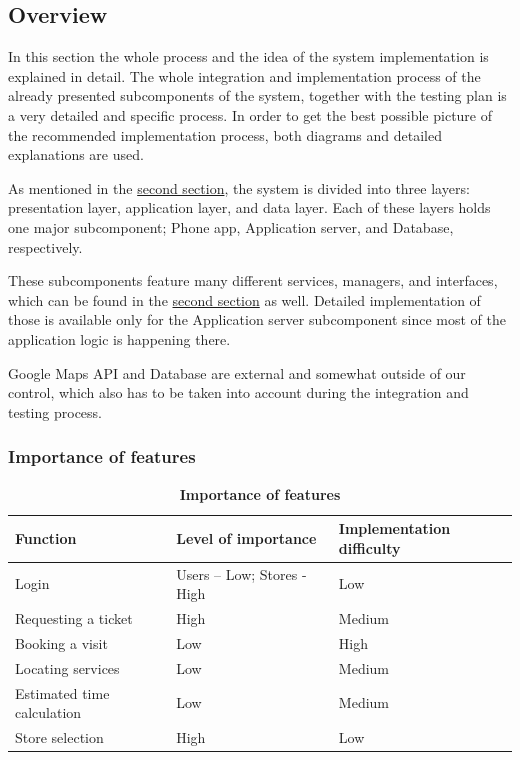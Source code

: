 \subsection{Overview}

\hspace{\parindent}In this section the whole process and the idea of the system implementation is explained in detail. The whole integration and implementation process of the already presented subcomponents of the system,  together with the testing plan is a very detailed and specific process. In order to get the best possible picture of the recommended implementation process, both diagrams and detailed explanations are used. \newline

As mentioned in the \hyperlink{section.2}{second section}, the system is divided into three layers: presentation layer, application layer, and data layer. Each of these layers holds one major subcomponent; Phone app, Application server, and Database, respectively.  \newline

 

These subcomponents feature many different services, managers, and interfaces, which can be found in the \hyperlink{section.2}{second section} as well. Detailed implementation of those is available only for the Application server subcomponent since most of the application logic is happening there. \newline

 

Google Maps API and Database are external and somewhat outside of our control, which also has to be taken into account during the integration and testing process.  


\subsubsection{Importance of features}

\begin{table}[H]
\begin{flushleft}
\begin{tabular}{|l|l|l|}
\hline
\textbf{Function }& \textbf{Level of importance} & \textbf{Implementation difficulty} \\
\hline
Login & Users – Low; Stores - High & Low \\
\hline
Requesting a ticket & High & Medium \\
\hline
Booking a visit & Low & High \\
\hline
Locating services & Low & Medium \\
\hline
Estimated time calculation & Low & Medium \\
\hline
Store selection & High & Low  \\
\hline
\end{tabular}
\end{flushleft}
\caption{\textbf{Importance of features}}
\label{tab:feat1}
\end{table}

